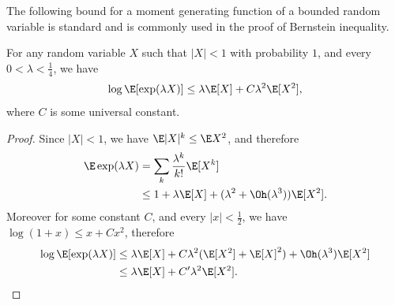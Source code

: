 \documentclass[11pt]{article}
\begin{document}
The following bound for a moment generating function of a bounded random variable is standard and is commonly used in the proof of Bernstein inequality.
\begin{lemma}
\label{lem:bounded-subgamma}
For any random variable $X$ such that $|X| < 1$ with probability $1$, and every $0 < \lambda < \frac{1}{4}$, we have
\begin{equation*}
    \log \E[\exp(\lambda X)] \leq \lambda \E[X] + C \lambda^2 \E[X^2],
\end{equation*}
where $C$ is some universal constant.
\end{lemma}
\begin{proof}
    Since $|X| < 1$, we have $\E |X|^k \leq \E X^2$, and therefore
    \begin{align*}
        \E \exp(\lambda X) & = \sum_k \frac{\lambda^k}{k!} \E[X^k] \\
        & \leq 1 + \lambda \E[X] + (\lambda^2 + \Oh(\lambda^3)) \E [X^2].
    \end{align*}
    Moreover for some constant $C$, and every $|x| < \frac{1}{2}$, we have $\log(1+x) \leq x + C x^2$, therefore 
    \begin{align*}
     \log \E[\exp(\lambda X)] & \leq \lambda \E[X] + C \lambda^2(\E[X^2] + \E[X]^2) + \Oh(\lambda^3) \E[X^2] \\
     & \leq \lambda \E[X] + C' \lambda^2 \E[X^2]. \qedhere
    \end{align*}
\end{proof}
\end{document}
